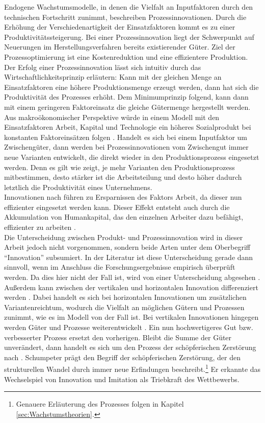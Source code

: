 Endogene Wachstumsmodelle, in denen die Vielfalt an Inputfaktoren durch den technischen Fortschritt zunimmt, beschreiben Prozessinnovationen. Durch die Erhöhung der Verschiedenartigkeit der Einsatzfaktoren kommt es zu einer Produktivitätssteigerung. Bei einer Prozessinnovation liegt der Schwerpunkt auf Neuerungen im Herstellungsverfahren bereits existierender Güter. Ziel der Prozessoptimierung ist eine Kostenreduktion und eine effizientere Produktion. Der Erfolg einer Prozessinnovation lässt sich intuitiv durch das Wirtschaftlichkeitsprinzip erläutern: Kann mit der gleichen Menge an Einsatzfaktoren eine höhere Produktionsmenge erzeugt werden, dann hat sich die Produktivität des Prozesses erhöht. Dem Minimumprinzip folgend, kann dann mit einem geringeren Faktoreinsatz die gleiche Gütermenge hergestellt werden. Aus makroökonomischer Perspektive würde in einem Modell mit den Einsatzfaktoren Arbeit, Kapital und Technologie ein höheres Sozialprodukt bei konstanten Faktoreinsätzen folgen \cite[Kapitel 10]{Frenkel.1999}. Handelt es sich bei einem Inputfaktor um Zwischengüter, dann werden bei Prozessinnovationen vom Zwischengut immer neue Varianten entwickelt, die direkt wieder in den Produktionsprozess eingesetzt werden. Denn es gilt wie \cite{Romer.1987,Romer.1990}  zeigt, je mehr Varianten den Produktionsprozess mitbestimmen, desto stärker ist die Arbeitsteilung und desto höher dadurch letztlich die Produktivität eines Unternehmens.\\
%
Innovationen nach \cite{Hicks.1932} führen zu Ersparnissen des Faktors Arbeit, da dieser nun effizienter eingesetzt werden kann. Dieser Effekt entsteht auch durch die Akkumulation von Humankapital, das den einzelnen Arbeiter dazu befähigt, effizienter zu arbeiten \cite[S.29]{Arrow.1969}.\\
%
Die Unterscheidung zwischen Produkt- und Prozessinnovation wird in dieser Arbeit jedoch nicht vorgenommen, sondern beide Arten unter dem Oberbegriff "`Innovation"' subsumiert. In der Literatur ist diese Unterscheidung gerade dann sinnvoll, wenn im Anschluss die Forschungsergebnisse empirisch überprüft werden. Da dies hier nicht der Fall ist, wird von einer Unterscheidung abgesehen \cite[Kapitel 12,S.411]{Acemoglu.2009}.\\
%
Außerdem kann zwischen der vertikalen und horizontalen Innovation differenziert werden \cite[S.20]{Grossman.1989a,vanLong.1997}. Dabei handelt es sich bei horizontalen Innovationen um zusätzlichen Variantenreichtum, wodurch die Vielfalt an möglichen Gütern und Prozessen zunimmt, wie es im Modell von \cite{Romer.1990} der Fall ist. Bei vertikalen Innovationen hingegen werden Güter und Prozesse weiterentwickelt \cite[S.20]{vanLong.1997}. Ein nun hochwertigeres Gut bzw. verbesserter Prozess ersetzt den vorherigen. Bleibt die Summe der Güter unverändert, dann handelt es sich um den Prozess der schöpferischen Zerstörung nach \cite{Schumpeter.1934a}. Schumpeter prägt den Begriff der schöpferischen Zerstörung, der den strukturellen Wandel durch immer neue Erfindungen beschreibt.\footnote{Genauere Erläuterung des Prozesses folgen in Kapitel \ref{sec:Wachstumstheorien}.} Er erkannte das Wechselspiel von Innovation und Imitation als Triebkraft des Wettbewerbs.\\
